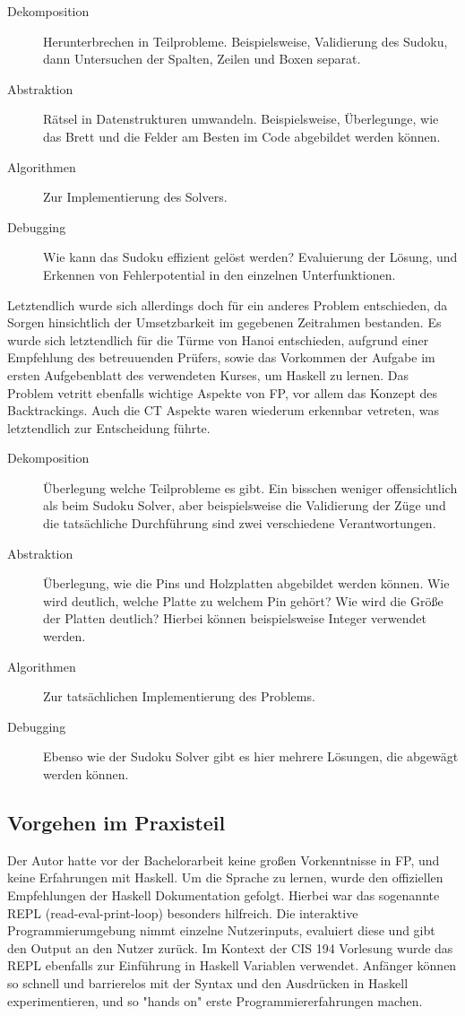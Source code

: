 \begin{description}
    \item[Dekomposition] Herunterbrechen in Teilprobleme. Beispielsweise, Validierung des Sudoku, dann Untersuchen der Spalten, Zeilen und Boxen separat.
    \item[Abstraktion] Rätsel in Datenstrukturen umwandeln. Beispielsweise, Überlegunge, wie das Brett und die Felder am Besten im Code abgebildet werden können.
    \item[Algorithmen] Zur Implementierung des Solvers.
    \item[Debugging] Wie kann das Sudoku effizient gelöst werden? Evaluierung der Lösung, und Erkennen von Fehlerpotential in den einzelnen Unterfunktionen.
\end{description}

Letztendlich wurde sich allerdings doch für ein anderes Problem entschieden, da Sorgen hinsichtlich der Umsetzbarkeit im gegebenen Zeitrahmen bestanden.
Es wurde sich letztendlich für die Türme von Hanoi entschieden, aufgrund einer Empfehlung des betreuuenden Prüfers, sowie das Vorkommen der Aufgabe im ersten Aufgebenblatt des verwendeten Kurses, um Haskell zu lernen. %
Das Problem vetritt ebenfalls wichtige Aspekte von FP, vor allem das Konzept des Backtrackings. Auch die CT Aspekte waren wiederum erkennbar vetreten, was letztendlich zur Entscheidung führte.

\begin{description}
    \item[Dekomposition] Überlegung welche Teilprobleme es gibt. Ein bisschen weniger offensichtlich als beim Sudoku Solver, aber beispielsweise die Validierung der Züge und die tatsächliche Durchführung sind zwei verschiedene Verantwortungen.
    \item[Abstraktion] Überlegung, wie die Pins und Holzplatten abgebildet werden können. Wie wird deutlich, welche Platte zu welchem Pin gehört? Wie wird die Größe der Platten deutlich? Hierbei können beispielsweise Integer verwendet werden.
    \item[Algorithmen] Zur tatsächlichen Implementierung des Problems.
    \item[Debugging] Ebenso wie der Sudoku Solver gibt es hier mehrere Lösungen, die abgewägt werden können.
\end{description}

\subsection{Vorgehen im Praxisteil}
Der Autor hatte vor der Bachelorarbeit keine großen Vorkenntnisse in FP, und keine Erfahrungen mit Haskell. Um die Sprache zu lernen, wurde den offiziellen Empfehlungen der Haskell Dokumentation gefolgt. Hierbei war das sogenannte REPL (read-eval-print-loop) besonders hilfreich. Die interaktive Programmierumgebung nimmt einzelne Nutzerinputs, evaluiert diese und gibt den Output an den Nutzer zurück. Im Kontext der CIS 194 Vorlesung wurde das REPL ebenfalls zur Einführung in Haskell Variablen verwendet.
Anfänger können so schnell und barrierelos mit der Syntax und den Ausdrücken in Haskell experimentieren, und so "hands on" erste Programmiererfahrungen machen.

